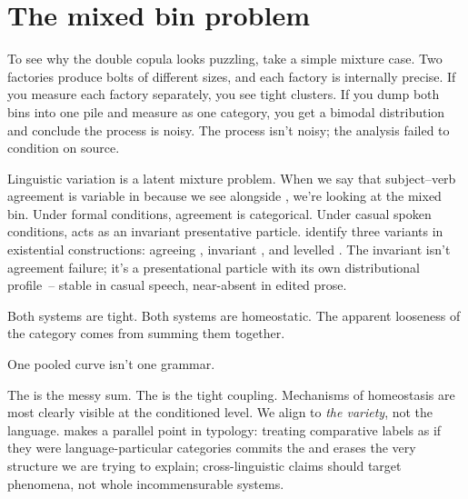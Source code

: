 \section{The mixed bin problem}
\label{sec:16:mixed-bin}

To see why the double copula looks puzzling, take a simple mixture case. Two factories produce bolts of different sizes, and each factory is internally precise. If you measure each factory separately, you see tight clusters. If you dump both bins into one pile and measure  as one category, you get a bimodal distribution and conclude the process is noisy. The process isn't noisy; the analysis failed to condition on source.

Linguistic variation is a latent mixture problem. When we say that subject--verb agreement is variable in  because we see  alongside , we're looking at the mixed bin. Under formal conditions, agreement is categorical. Under casual spoken conditions,  acts as an invariant presentative particle. \textcite{krejciHilton2022} identify three variants in existential constructions: agreeing , invariant , and levelled . The invariant  isn't agreement failure; it's a presentational particle with its own distributional profile~-- stable in casual speech, near-absent in edited prose.

Both systems are tight. Both systems are homeostatic. The apparent looseness of the category comes from summing them together.

One pooled curve isn't one grammar.

The  is the messy sum. The  is the tight coupling. Mechanisms of homeostasis are most clearly visible at the conditioned level. We align to \emph{the variety}, not the language. \textcite{haspelmath2018} makes a parallel point in typology: treating comparative labels as if they were language-particular categories commits the  and erases the very structure we are trying to explain; cross-linguistic claims should target phenomena, not whole incommensurable systems.

